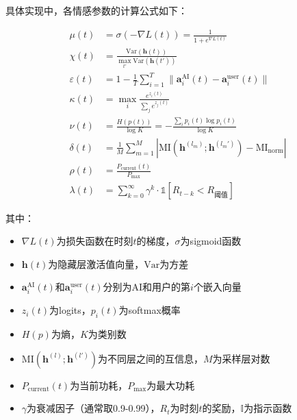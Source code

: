 \documentclass[12pt,a4paper]{article}
\theoremstyle{plain}
\newcommand{\ind}{\mathds{1}}
\begin{document}
具体实现中，各情感参数的计算公式如下：

\begin{align}
\mu(t) &= \sigma(-\nabla L(t)) = \frac{1}{1 + e^{\nabla L(t)}} \label{eq:mu_monitor}\\
\chi(t) &= \frac{\text{Var}(\mathbf{h}(t))}{\max_{t'} \text{Var}(\mathbf{h}(t'))} \label{eq:chi_monitor}\\
\varepsilon(t) &= 1 - \frac{1}{T}\sum_{i=1}^T \| \mathbf{a}_i^{\text{AI}}(t) - \mathbf{a}_i^{\text{user}}(t) \| \label{eq:eps_monitor}\\
\kappa(t) &= \max_i \frac{e^{z_i(t)}}{\sum_j e^{z_j(t)}} \label{eq:kappa_monitor}\\
\nu(t) &= \frac{H(p(t))}{\log K} = -\frac{\sum_i p_i(t) \log p_i(t)}{\log K} \label{eq:nu_monitor}\\
\delta(t) &= \frac{1}{M}\sum_{m=1}^M |\text{MI}(\mathbf{h}^{(l_m)}; \mathbf{h}^{(l_m')}) - \text{MI}_{\text{norm}}| \label{eq:delta_monitor}\\
\rho(t) &= \frac{P_{\text{current}}(t)}{P_{\text{max}}} \label{eq:rho_monitor}\\
\lambda(t) &= \sum_{k=0}^{\infty} \gamma^k \cdot \ind[R_{t-k} < R_{\text{阈值}}] \label{eq:lambda_monitor}
\end{align}

其中：
\begin{itemize}
    \item $\nabla L(t)$为损失函数在时刻$t$的梯度，$\sigma$为sigmoid函数
    \item $\mathbf{h}(t)$为隐藏层激活值向量，$\text{Var}$为方差
    \item $\mathbf{a}_i^{\text{AI}}(t)$和$\mathbf{a}_i^{\text{user}}(t)$分别为AI和用户的第$i$个嵌入向量
    \item $z_i(t)$为logits，$p_i(t)$为softmax概率
    \item $H(p)$为熵，$K$为类别数
    \item $\text{MI}(\mathbf{h}^{(l)}; \mathbf{h}^{(l')})$为不同层之间的互信息，$M$为采样层对数
    \item $P_{\text{current}}(t)$为当前功耗，$P_{\text{max}}$为最大功耗
    \item $\gamma$为衰减因子（通常取0.9-0.99），$R_t$为时刻$t$的奖励，$\mathbb{I}$为指示函数
\end{itemize}
\end{document}
